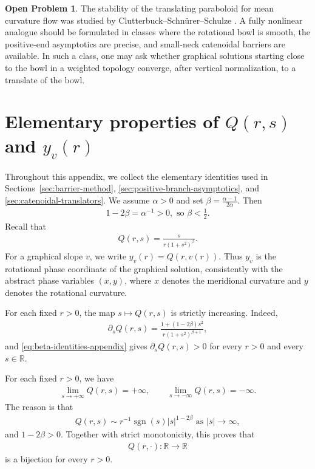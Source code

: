 \documentclass{amsart}
\theoremstyle{plain}
\theoremstyle{mainintrothm}
\theoremstyle{definition}
\newtheorem{op}[theorem]{Open Problem}
\begin{document}
\begin{op}
	The stability of the translating paraboloid for mean curvature flow was
	studied by Clutterbuck--Schn\"urer--Schulze
	\cite{clutterbuck2007stability}.  A fully nonlinear analogue should be
	formulated in classes where the rotational bowl is smooth, the positive-end
	asymptotics are precise, and small-neck catenoidal barriers are available.  In
	such a class, one may ask whether graphical solutions starting close to the
	bowl in a weighted topology converge, after vertical normalization, to a
	translate of the bowl.
\end{op}


	\appendix
	
\section{Elementary properties of $Q(r,s)$ and $y_v(r)$}
\label{app:q-eta-properties}

Throughout this appendix, we collect the elementary identities used in
Sections~\ref{sec:barrier-method}, \ref{sec:positive-branch-asymptotics}, and
\ref{sec:catenoidal-translators}.  We assume $\alpha>0$ and set
$\beta=\frac{\alpha-1}{2\alpha}$.  Then
\begin{align}
	\label{eq:beta-identities-appendix}
	1-2\beta=\alpha^{-1}>0,
	\mbox{ so }
	\beta<\frac12 .
\end{align}
Recall that
\begin{align}
	\label{eq:q-def-appendix}
	Q(r,s)
	=
	\frac{s}{r(1+s^2)^\beta}.
\end{align}
For a graphical slope $v$, we write $y_v(r)=Q(r,v(r))$.  Thus $y_v$ is the
rotational phase coordinate of the graphical solution, consistently with the
abstract phase variables $(x,y)$, where $x$ denotes the meridional curvature and
$y$ denotes the rotational curvature.

\medskip

For each fixed $r>0$, the map $s\mapsto Q(r,s)$ is strictly increasing.  Indeed,
\begin{align}
	\label{eq:q-partial-s}
	\partial_s Q(r,s)
	=
	\frac{1+(1-2\beta)s^2}
	{r(1+s^2)^{\beta+1}},
\end{align}
and \eqref{eq:beta-identities-appendix} gives
$\partial_s Q(r,s)>0$ for every $r>0$ and every $s\in\mathbb R$.

\medskip

For each fixed $r>0$, we have
\begin{align}
	\label{eq:q-limits}
	\lim\limits_{s\to+\infty}Q(r,s)=+\infty,
	\qquad
	\lim\limits_{s\to-\infty}Q(r,s)=-\infty.
\end{align}
The reason is that
\begin{align}
	\label{eq:q-infinity-asymptotic}
	Q(r,s)
	\sim
	r^{-1}\operatorname{sgn}(s)|s|^{1-2\beta}
	\mbox{ as } |s|\to\infty,
\end{align}
and $1-2\beta>0$.  Together with strict monotonicity, this proves that
\begin{align}
	\label{eq:q-bijection}
	Q(r,\cdot):\mathbb R\to\mathbb R
\end{align}
is a bijection for every $r>0$.
\end{document}
